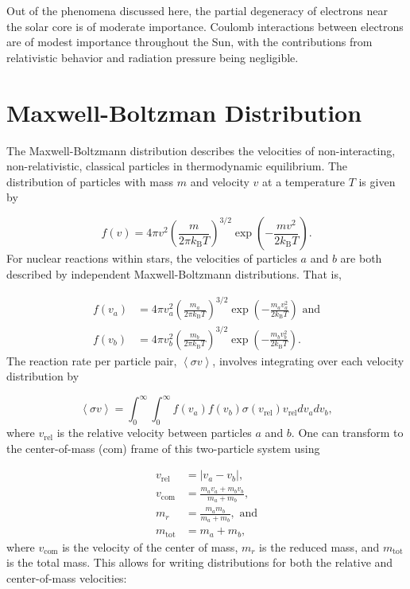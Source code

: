 \documentclass[12pt]{article}
\newcommand{\bigparenthesis}[1]{\left(#1\right)}
\begin{document}
Out of the phenomena discussed here, the partial degeneracy of electrons near the solar core is of moderate importance. Coulomb interactions between electrons are of modest importance throughout the Sun, with the contributions from relativistic behavior and radiation pressure being negligible.

\pagebreak

\setcounter{equation}{0}
\section{Maxwell-Boltzman Distribution} \label{ap:MB_dist}
The Maxwell-Boltzmann distribution describes the velocities of non-interacting, non-relativistic, classical particles in thermodynamic equilibrium. The distribution of particles with mass $m$ and velocity $v$ at a temperature $T$ is given by

\begin{equation}
    f(v) = 4\pi v^2 \bigparenthesis{\frac{m}{2\pi k_\mathrm{B}T}}^{3/2} \exp \bigparenthesis{-\frac{mv^2}{2k_\mathrm{B}T}}.
\end{equation}
%
For nuclear reactions within stars, the velocities of particles $a$ and $b$ are both described by independent Maxwell-Boltzmann distributions. That is,

\begin{align}
    f(v_a) &= 4\pi v_a^2 \bigparenthesis{\frac{m_a}{2\pi k_\mathrm{B}T}}^{3/2} \exp \bigparenthesis{-\frac{m_a v_a^2}{2k_\mathrm{B}T}}\text{ and} \\
    f(v_b) &= 4\pi v_b^2 \bigparenthesis{\frac{m_b}{2\pi k_\mathrm{B}T}}^{3/2} \exp \bigparenthesis{-\frac{m_b v_b^2}{2k_\mathrm{B}T}}.
\end{align}
%
The reaction rate per particle pair, $\left<\sigma v\right>$, involves integrating over each velocity distribution by

\begin{equation}
    \left<\sigma v\right> = \int_0^\infty \int_0^\infty f(v_a)f(v_b) \sigma(v_\mathrm{rel})v_\mathrm{rel} dv_a dv_b,
\end{equation}
%
where $v_\mathrm{rel}$ is the relative velocity between particles $a$ and $b$. One can transform to the center-of-mass (com) frame of this two-particle system using

\begin{align}
    v_\mathrm{rel} &= |v_a - v_b|, \\
    v_\mathrm{com} &= \frac{m_a v_a + m_b v_b}{m_a + m_b}, \\
    m_r &= \frac{m_a m_b}{m_a + m_b},\text{ and} \\
    m_\mathrm{tot} &= m_a + m_b,
\end{align}
%
where $v_\mathrm{com}$ is the velocity of the center of mass, $m_r$ is the reduced mass, and $m_\mathrm{tot}$ is the total mass. This allows for writing distributions for both the relative and center-of-mass velocities:
\end{document}
